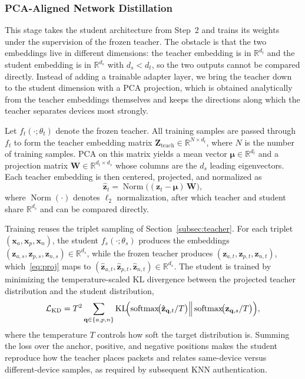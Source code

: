 \documentclass[journal,comsoc]{IEEEtran}
\begin{document}
\subsubsection{PCA-Aligned Network Distillation}

This stage takes the student architecture from Step~2 and trains its weights under the supervision of the frozen teacher.
The obstacle is that the two embeddings live in different dimensions: the teacher embedding is in $\mathbb{R}^{d_t}$ and the student embedding is in $\mathbb{R}^{d_s}$ with $d_s < d_t$, so the two outputs cannot be compared directly.
Instead of adding a trainable adapter layer, we bring the teacher down to the student dimension with a PCA projection, which is obtained analytically from the teacher embeddings themselves and keeps the directions along which the teacher separates devices most strongly.

Let $f_t(\cdot;\theta_t)$ denote the frozen teacher.
All training samples are passed through $f_t$ to form the teacher embedding matrix $\mathbf{Z}_{\text{teach}} \in \mathbb{R}^{N \times d_t}$, where $N$ is the number of training samples.
PCA on this matrix yields a mean vector $\boldsymbol{\mu} \in \mathbb{R}^{d_t}$ and a projection matrix $\mathbf{W} \in \mathbb{R}^{d_t \times d_s}$ whose columns are the $d_s$ leading eigenvectors.
Each teacher embedding is then centered, projected, and normalized as
\begin{equation}
\label{eq:proj}
\hat{\mathbf{z}}_t =
\operatorname{Norm}\!\bigl(
(\mathbf{z}_t - \boldsymbol{\mu}) \, \mathbf{W}
\bigr),
\end{equation}
where $\operatorname{Norm}(\cdot)$ denotes $\ell_2$ normalization, after which teacher and student share $\mathbb{R}^{d_s}$ and can be compared directly.

Training reuses the triplet sampling of Section~\ref{subsec:teacher}.
For each triplet $(\mathbf{x}_a, \mathbf{x}_p, \mathbf{x}_n)$, the student $f_s(\cdot;\theta_s)$ produces the embeddings $(\mathbf{z}_{a,s}, \mathbf{z}_{p,s}, \mathbf{z}_{n,s}) \in \mathbb{R}^{d_s}$, while the frozen teacher produces $(\mathbf{z}_{a,t}, \mathbf{z}_{p,t}, \mathbf{z}_{n,t})$, which~\eqref{eq:proj} maps to $(\hat{\mathbf{z}}_{a,t}, \hat{\mathbf{z}}_{p,t}, \hat{\mathbf{z}}_{n,t}) \in \mathbb{R}^{d_s}$.
The student is trained by minimizing the temperature-scaled KL divergence between the projected teacher distribution and the student distribution,
\begin{equation}
\label{eq:kd}
\mathcal{L}_{\text{KD}} =
T^2 \sum_{\mathbf{q} \in \{a,p,n\}}
\mathrm{KL}\!\Bigl(
\operatorname{softmax}\!\bigl(\hat{\mathbf{z}}_{\mathbf{q},t}/T\bigr)
\Big\Vert
\operatorname{softmax}\!\bigl(\mathbf{z}_{\mathbf{q},s}/T\bigr)
\Bigr),
\end{equation}
where the temperature $T$ controls how soft the target distribution is.
Summing the loss over the anchor, positive, and negative positions makes the student reproduce how the teacher places packets and relates same-device versus different-device samples, as required by subsequent KNN authentication.
\end{document}

